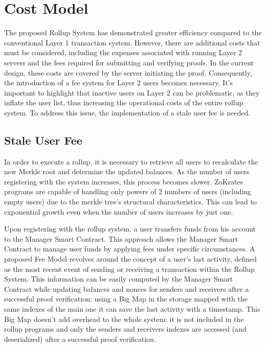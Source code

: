 \section{Cost Model}

The proposed Rollup System has demonstrated greater efficiency compared to the conventional Layer 1 transaction system. However, there are additional costs that must be considered, including the expenses associated with running Layer 2 servers and the fees required for submitting and verifying proofs. In the current design, these costs are covered by the server initiating the proof. Consequently, the introduction of a fee system for Layer 2 users becomes necessary. It's important to highlight that inactive users on Layer 2 can be problematic, as they inflate the user list, thus increasing the operational costs of the entire rollup system. To address this issue, the implementation of a stale user fee is needed.

\subsection{Stale User Fee\label{subsec:7_staleuserfee}}

In order to execute a rollup, it is necessary to retrieve all users to recalculate the new Merkle root and determine the updated balances. As the number of users registering with the system increases, this process becomes slower. ZoKrates programs are capable of handling only powers of 2 numbers of users (including empty users) due to the merkle tree's structural characteristics. This can lead to exponential growth even when the number of users increases by just one.

Upon registering with the rollup system, a user transfers funds from his account to the Manager Smart Contract. This approach allows the Manager Smart Contract to manage user funds by applying fees under specific circumstances. A proposed Fee Model revolves around the concept of a user's last activity, defined as the most recent event of sending or receiving a transaction within the Rollup System. This information can be easily computed by the Manager Smart Contract while updating balances and nonces for senders and receivers after a successful proof verification: using a Big Map in the storage mapped with the same indexes of the main one it can save the last activity with a timestamp. This Big Map doesn't add overhead to the whole system: it is not included in the rollup programs and only the senders and receivers indexes are accessed (and deserialized) after a successful proof verification.

